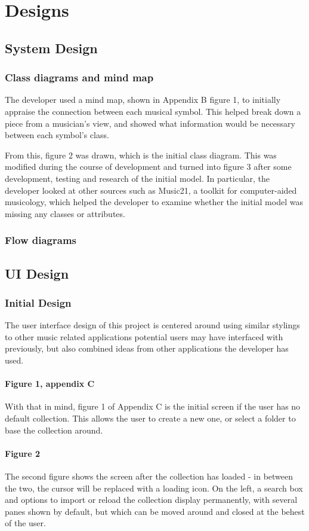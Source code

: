 \section{Designs}
\subsection{System Design}
\subsubsection{Class diagrams and mind map}
The developer used a mind map, shown in Appendix B figure 1, to initially appraise the connection between each musical symbol. This helped break down a piece from a musician's view, and showed what information would be necessary between each symbol's class.

From this, figure 2 was drawn, which is the initial class diagram. This was modified during the course of development and turned into figure 3 after some development, testing and research of the initial model. In particular, the developer looked at other sources such as Music21, a toolkit for computer-aided musicology\parencite{Music21}, which helped the developer to examine whether the initial model was missing any classes or attributes.
\subsubsection{Flow diagrams}
\subsection{UI Design}
\subsubsection{Initial Design}
The user interface design of this project is centered around using similar stylings to other music related applications potential users may have interfaced with previously, but also combined ideas from other applications the developer has used.
\paragraph{Figure 1, appendix C}
With that in mind, figure 1 of Appendix C is the initial screen if the user has no default collection. This allows the user to create a new one, or select a folder to base the collection around.

\paragraph{Figure 2}
The second figure shows the screen after the collection has loaded - in between the two, the cursor will be replaced with a loading icon. On the left, a search box and options to import or reload the collection display permanently, with several panes shown by default, but which can be moved around and closed at the behest of the user.
 
